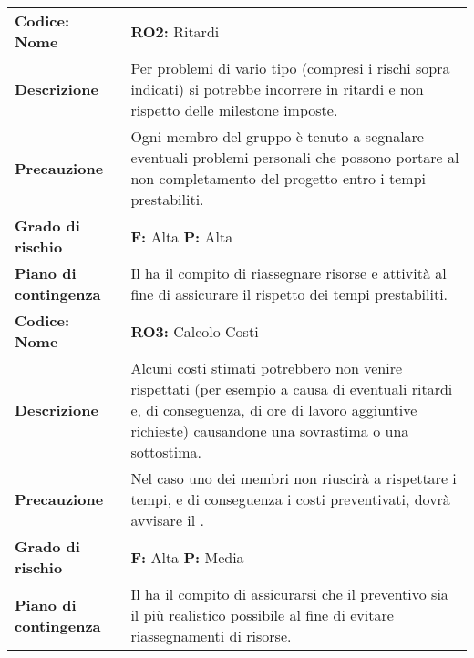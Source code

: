 {\begin{longtable}{C{3.5cm} | C{11cm}}
\textbf{Codice: Nome} & \textbf{RO2: }{Ritardi}\\
\textbf{Descrizione} & Per problemi di vario tipo (compresi i rischi sopra indicati) si potrebbe incorrere in ritardi e non rispetto delle milestone imposte.\\ 
\textbf{Precauzione} & Ogni membro del gruppo è tenuto a segnalare eventuali problemi personali che possono portare al non completamento del progetto entro i tempi prestabiliti.\\
\textbf{Grado di rischio} & \textbf{F: }Alta {\textbf{P: }}Alta\\
\textbf{Piano di contingenza} & Il \respProg{} ha il compito di riassegnare risorse e attività al fine di assicurare il rispetto dei tempi prestabiliti.\\
\hline

\textbf{Codice: Nome} & \textbf{RO3: }{Calcolo Costi}\\
\textbf{Descrizione} & Alcuni costi stimati potrebbero non venire rispettati (per esempio a causa di eventuali ritardi e, di conseguenza, di ore di lavoro aggiuntive richieste) causandone una sovrastima o una sottostima.\\
\textbf{Precauzione} & Nel caso uno dei membri non riuscirà a rispettare i tempi, e di conseguenza i costi preventivati, dovrà avvisare il \respProg{}.\\
\textbf{Grado di rischio} & \textbf{F: }Alta \textbf{P: }Media\\
\textbf{Piano di contingenza} & Il \respProg{} ha il compito di assicurarsi che il preventivo sia il più realistico possibile al fine di evitare riassegnamenti di risorse.\\
\hline
\end{longtable}
}